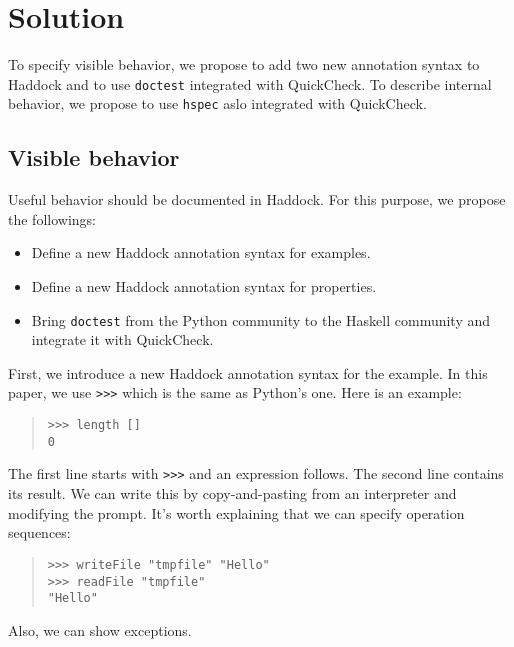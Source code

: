 \documentclass[preprint]{sigplanconf}
\begin{document}
\section{Solution}

To specify visible behavior, we propose to add two new annotation syntax to Haddock and to use {\tt doctest} integrated with QuickCheck. To describe internal behavior, we propose to use {\tt hspec} aslo integrated with QuickCheck.

\subsection{Visible behavior}
\label{sec:Visible-behavior}

Useful behavior should be documented in Haddock. 
For this purpose, we propose the followings:

\begin{itemize}
\item Define a new Haddock annotation syntax for examples.
\item Define a new Haddock annotation syntax for properties.
\item Bring {\tt doctest} from the Python community to the Haskell
community and integrate it with QuickCheck.
\end{itemize}

First, we introduce a new Haddock annotation syntax for the example.
In this paper, we use {\tt >>>} which is the same as Python's one.
Here is an example:

\begin{quote}
\small
\begin{verbatim}
>>> length []
0
\end{verbatim}
\end{quote}

\noindent The first line starts with {\tt >>>} and an expression follows. The second line contains its result. We can write this by copy-and-pasting from an interpreter and modifying the prompt.
It's worth explaining that we can specify operation sequences:

\begin{quote}
\small
\begin{verbatim}
>>> writeFile "tmpfile" "Hello"
>>> readFile "tmpfile"
"Hello"
\end{verbatim}
\end{quote}

\noindent Also, we can show exceptions.
\end{document}
